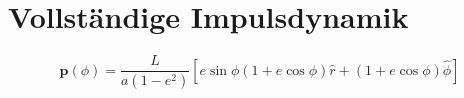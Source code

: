 \section{Vollständige Impulsdynamik}
\[
\mathbf{p}(\phi) = \frac{L}{a(1 - e^2)} \left[ e \sin \phi (1 + e \cos \phi) \hat{r} + (1 + e \cos \phi) \hat{\phi} \right]
\]
